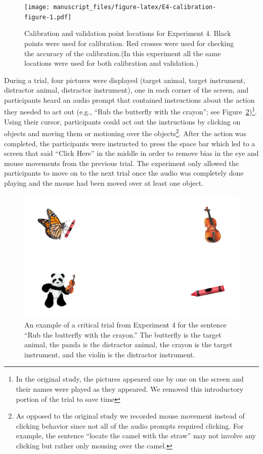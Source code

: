 \documentclass[
  man,floatsintext]{apa6}
\begin{document}
\begin{figure}
\centering
\texttt{[image: manuscript\_files/figure-latex/E4-calibration-figure-1.pdf]}
\caption{\label{fig:E4-calibration-figure}Calibration and validation point locations for Experiment 4. Black points were used for calibration. Red crosses were used for checking the accuracy of the calibration.(In this experiment all the same locations were used for both calibration and validation.)}
\end{figure}

During a trial, four pictures were displayed (target animal, target
instrument, distractor animal, distractor instrument), one in each
corner of the screen, and participants heard an audio prompt that
contained instructions about the action they needed to act out (e.g.,
``Rub the butterfly with the crayon''; see Figure~\ref{fig:E4-example-trial})\footnote{In the original study, the pictures appeared one by one on the
  screen and their names were played as they appeared. We removed this
  introductory portion of the trial to save time}. Using their
cursor, participants could act out the instructions by clicking on
objects and moving them or motioning over the objects\footnote{As opposed to the original study we recorded mouse movement
  instead of clicking behavior since not all of the audio prompts
  required clicking. For example, the sentence ``locate the camel with
  the straw'' may not involve any clicking but rather only mousing over
  the camel.}. After the
action was completed, the participants were instructed to press the
space bar which led to a screen that said ``Click Here'' in the middle in
order to remove bias in the eye and mouse movements from the previous
trial. The experiment only allowed the participants to move on to the
next trial once the audio was completely done playing and the mouse had
been moved over at least one object.

\begin{figure}
\centering
\includegraphics{group-d/E4-example-figure.jpeg}
\caption{\label{fig:E4-example-trial}An example of a critical trial from Experiment 4 for the sentence ``Rub the butterfly with the crayon.'' The butterfly is the target animal, the panda is the distractor animal, the crayon is the target instrument, and the violin is the distractor instrument.}
\end{figure}
\end{document}
